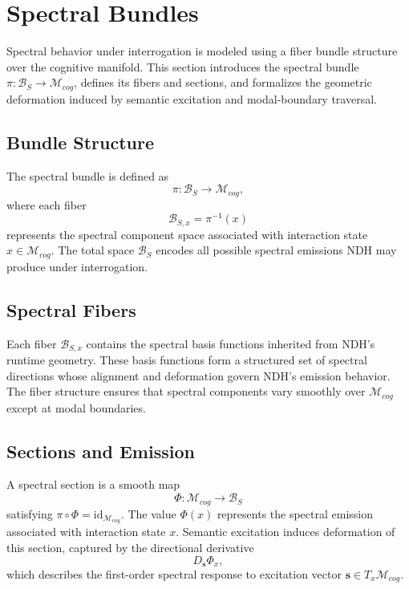 \section{Spectral Bundles}
\label{sec:spectral-bundles}

Spectral behavior under interrogation is modeled using a fiber bundle structure
over the cognitive manifold. This section introduces the spectral bundle
$\pi : \mathcal{B}_S \to \mathcal{M}_{cog}$, defines its fibers and sections,
and formalizes the geometric deformation induced by semantic excitation and
modal-boundary traversal.

\subsection{Bundle Structure}

The spectral bundle is defined as
\[
\pi : \mathcal{B}_S \to \mathcal{M}_{cog},
\]
where each fiber
\[
\mathcal{B}_{S,x} = \pi^{-1}(x)
\]
represents the spectral component space associated with interaction state
$x \in \mathcal{M}_{cog}$. The total space $\mathcal{B}_S$ encodes all possible
spectral emissions NDH may produce under interrogation.

\subsection{Spectral Fibers}

Each fiber $\mathcal{B}_{S,x}$ contains the spectral basis functions inherited
from NDH's runtime geometry. These basis functions form a structured set of
spectral directions whose alignment and deformation govern NDH's emission
behavior. The fiber structure ensures that spectral components vary smoothly
over $\mathcal{M}_{cog}$ except at modal boundaries.

\subsection{Sections and Emission}

A spectral section is a smooth map
\[
\Phi : \mathcal{M}_{cog} \to \mathcal{B}_S
\]
satisfying $\pi \circ \Phi = \mathrm{id}_{\mathcal{M}_{cog}}$. The value
$\Phi(x)$ represents the spectral emission associated with interaction state
$x$. Semantic excitation induces deformation of this section, captured by the
directional derivative
\[
D_{\mathbf{s}} \Phi_x,
\]
which describes the first-order spectral response to excitation vector
$\mathbf{s} \in T_x \mathcal{M}_{cog}$.

